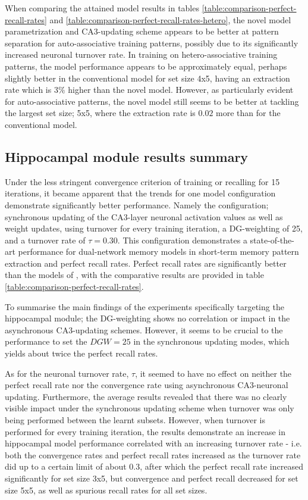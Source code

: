 When comparing the attained model results in tables \ref{table:comparison-perfect-recall-rates} and \ref{table:comparison-perfect-recall-rates-hetero}, the novel model parametrization and CA3-updating scheme appears to be better at pattern separation for auto-associative training patterns, possibly due to its significantly increased neuronal turnover rate. In training on hetero-associative training patterns, the model performance appears to be approximately equal, perhaps slightly better in the conventional model for set size 4x5, having an extraction rate which is $3 \%$ higher than the novel model. However, as particularly evident for auto-associative patterns, the novel model still seems to be better at tackling the largest set size; 5x5, where the extraction rate is $0.02$ more than for the conventional model.

\subsection{Hippocampal module results summary}

Under the less stringent convergence criterion of training or recalling for 15 iterations, it became apparent that the trends for one model configuration demonstrate significantly better performance. Namely the configuration; synchronous updating of the CA3-layer neuronal activation values as well as weight updates, using turnover for every training iteration, a DG-weighting of 25, and a turnover rate of $\tau=0.30$.
This configuration demonstrates a state-of-the-art performance for dual-network memory models in short-term memory pattern extraction and perfect recall rates. Perfect recall rates are significantly better than the models of \citep{Hattori2014, Hattori2010}, with the comparative results are provided in table \ref{table:comparison-perfect-recall-rates}.


To summarise the main findings of the experiments specifically targeting the hippocampal module; the DG-weighting shows no correlation or impact in the asynchronous CA3-updating schemes. However, it seems to be crucial to the performance to set the $DGW=25$ in the synchronous updating modes, which yields about twice the perfect recall rates.

As for the neuronal turnover rate, $\tau$, it seemed to have no effect on neither the perfect recall rate nor the convergence rate using asynchronous CA3-neuronal updating. Furthermore, the average results revealed that there was no clearly visible impact under the synchronous updating scheme when turnover was only being performed between the learnt subsets. However, when turnover is performed for every training iteration, the results demonstrate an increase in hippocampal model performance correlated with an increasing turnover rate - i.e. both the convergence rates and perfect recall rates increased as the turnover rate did up to a certain limit of about 0.3, after which the perfect recall rate increased significantly for set size 3x5, but convergence and perfect recall decreased for set size 5x5, as well as spurious recall rates for all set sizes.

